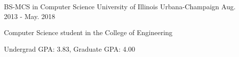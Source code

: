 

\begin{cventries}

  \cventry
    {BS-MCS in Computer Science} %
    {University of Illinois} %
    {Urbana-Champaign} %
    {Aug. 2013 - May. 2018} %
    {
      \begin{cvitems} %
        \item {Computer Science student in the College of Engineering}
        \item {Undergrad GPA: 3.83, Graduate GPA: 4.00}
      \end{cvitems}
    }

\end{cventries}
